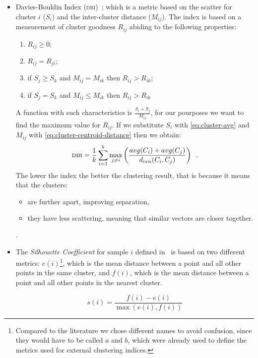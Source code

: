 \begin{itemize}
	\item Davies-Bouldin Index (\textsc{dbi})~\cite{bouldin1979}; which is a metric based on
		the scatter for cluster $i$ ($S_i$) and the inter-cluster distance ($M_{ij}$). The index is based on a measurement of cluster goodness $R_{ij}$ abiding to the following properties:
		\begin{enumerate}
			\item $R_{ij} \geq 0$;
			\item $R_{ij} = R_{ji}$;
			\item if $S_j \geq S_k$ and $M_{ij} = M_{ik}$ then $R_{ij} > R_{ik}$;
			\item if $S_j = S_k$ and $M_{ij} \leq M_{ik}$ then $R_{ij} > R_{ik}$
		\end{enumerate}
		A function with such characteristics is $\frac{S_i + S_j}{M_{ij}}$, for our
		pourposes we want to find the maximum value for $R_{ij}$. If we substitute $S_i$ with
		\ref{eq:cluster-avg} and $M_{ij}$ with \ref{eq:cluster-centroid-distance} then we
		obtain:
		\begin{equation*}
			\textsc{dbi} = \frac{1}{k}\sum_{i = 1}^k\max_{j \neq i}\left(\frac{avg(C_i)
			+ avg(C_j)}{d_{cen}(C_i, C_j)}\right) \enspace.
		\end{equation*}
		The lower the index the better the clustering result, that is because it means that
		the clusters:
		\begin{itemize}
			\item are further apart, improving separation,
			\item they have less scattering, meaning that similar vectors are closer
				together.
		\end{itemize}.
	\item The \emph{Silhouette Coefficient} for sample $i$ defined in~\cite{rousseuw1987}
		is based on two different metrics: $e(i)$\footnote{
			Compared to the literature we chose different names to avoid confusion, since they would have to be called $a$ and $b$, which were already used to define the metrics used for external clustering indices.
		}, which is the mean distance between a point and all other points in the same cluster, and $f(i)$, which is the mean distance between a point and all other points in the nearest cluster.

		\begin{equation*}
			s(i) = \frac{f(i) - e(i)}{\max(e(i), f(i))}
		\end{equation*}
\end{itemize}

